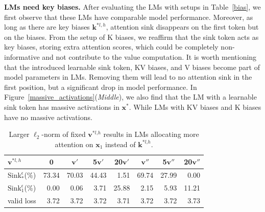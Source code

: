\documentclass{article} \usepackage{iclr2025_conference,times}
\begin{document}
\textbf{LMs need key biases.} After evaluating the LMs with setups in Table~\ref{bias}, we first observe that these LMs have comparable model performance. Moreover, as long as there are key biases $\boldsymbol{k}^{*l\textrm{,}\,h}$, attention sink disappears on the first token but on the biases. From the setup of K biases, we reaffirm that the sink token acts as key biases, storing extra attention scores, which could be completely non-informative and not contribute to the value computation. It is worth mentioning that the introduced learnable sink token, KV biases, and V biases become part of model parameters in LMs. Removing them will lead to no attention sink in the first position, but a significant drop in model performance. In Figure~\ref{massive_activations}(\emph{Middle}),  we also find that the LM with a learnable sink token has massive activations in $\boldsymbol{x}^*$. While LMs with KV biases and K biases have no massive activations.




\begin{table}[t]
\vspace{-0.2cm}
\caption{Larger $\ell_2$-norm of fixed $\boldsymbol{v}^{*l\textrm{,}h}$ results in LMs allocating more attention on $\boldsymbol{x}_1$ instead of $\boldsymbol{k}^{*l\textrm{,}h}$.}
\vspace{-.4cm}
\begin{center}
\begin{tabular}{l|ccccccc}
\toprule
$\boldsymbol{v}^{*l,h}$ & $\boldsymbol{0}$ & $\boldsymbol{v}'$ & 5$\boldsymbol{v}'$ & 20$\boldsymbol{v}'$ & $\boldsymbol{v}''$ & 5$\boldsymbol{v}''$  & 20$\boldsymbol{v}''$  \\
\midrule
$\textrm{Sink}_{*}^{\epsilon}$(\%) & 73.34 & 70.03 & 44.43 & \,\,\,1.51 & 69.74 & 27.99 &  \,\,\,0.00 \\
$\textrm{Sink}_{1}^{\epsilon}$(\%) & \,\,\,0.00 &  \,\,\,0.06 & \,\,\,3.71 & 25.88 & \,\,\,2.15 & \,\,\,5.93 & 11.21 \\
valid loss & \,\,\,3.72 & \,\,\,3.72 & \,\,\,3.72 & \,\,\,3.71 & \,\,\,3.72 & \,\,\,3.72 & \,\,\,3.73 \\
\bottomrule
\end{tabular}
\end{center}
\vspace{-.4cm}
\label{v_norm}
\end{table}
\end{document}
